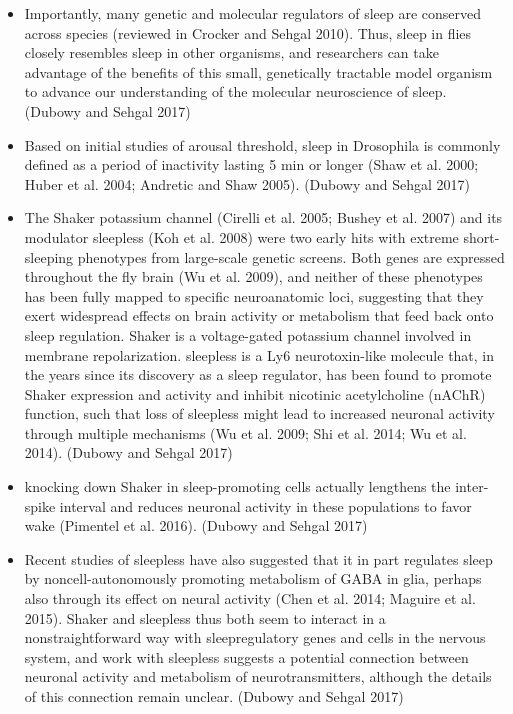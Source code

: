 \documentclass[11pt]{article}
\begin{document}
\begin{itemize}
    \item Importantly, many genetic and molecular regulators of sleep are conserved across species 
    (reviewed in Crocker and Sehgal 2010). Thus, sleep in flies closely resembles sleep in other 
    organisms, and researchers can take advantage of the benefits of this small, genetically 
    tractable model organism to advance our understanding of the molecular neuroscience of sleep.
    \parencite{dubowyCircadianRhythmsSleep2017} (Dubowy and Sehgal 2017)

    \item Based on initial studies of arousal threshold, sleep in Drosophila is commonly defined 
    as a period of inactivity lasting 5 min or longer (Shaw et al. 2000; Huber et al. 2004; Andretic 
    and Shaw 2005).
    \parencite{dubowyCircadianRhythmsSleep2017} (Dubowy and Sehgal 2017)

    \newpage
    \item The Shaker potassium channel (Cirelli et al. 2005; Bushey et al. 2007) and its modulator 
    sleepless (Koh et al. 2008) were two early hits with extreme short-sleeping phenotypes from 
    large-scale genetic screens. Both genes are expressed throughout the fly brain (Wu et al. 2009),
    and neither of these phenotypes has been fully mapped to specific neuroanatomic loci, suggesting
    that they exert widespread effects on brain activity or metabolism that feed back onto sleep 
    regulation. Shaker is a voltage-gated potassium channel involved in membrane repolarization.
    sleepless is a Ly6 neurotoxin-like molecule that, in the years since its discovery as a 
    sleep regulator, has been found to promote Shaker expression and activity and inhibit 
    nicotinic acetylcholine (nAChR) function, such that loss of sleepless might lead to 
    increased neuronal activity through multiple mechanisms 
    (Wu et al. 2009; Shi et al. 2014; Wu et al. 2014).
    \parencite{dubowyCircadianRhythmsSleep2017} (Dubowy and Sehgal 2017)

    \item knocking down Shaker in sleep-promoting cells actually lengthens the inter-spike 
    interval and reduces neuronal activity in these populations to favor wake (Pimentel et al. 2016).
    \parencite{dubowyCircadianRhythmsSleep2017} (Dubowy and Sehgal 2017)

    \item Recent studies of sleepless have also suggested that it in part regulates sleep by 
    noncell-autonomously promoting metabolism of GABA in glia, perhaps also through its effect 
    on neural activity (Chen et al. 2014; Maguire et al. 2015).
    Shaker and sleepless thus both seem to interact in a nonstraightforward way with sleepregulatory
    genes and cells in the nervous system, and work with sleepless suggests a potential connection 
    between neuronal activity and metabolism of neurotransmitters, although the details of this 
    connection remain unclear.
    \parencite{dubowyCircadianRhythmsSleep2017} (Dubowy and Sehgal 2017)


\end{itemize}
\end{document}
